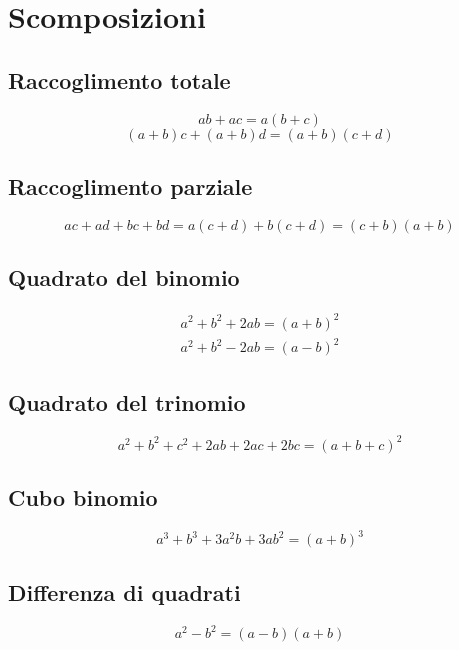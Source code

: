\chapter{Scomposizioni}
\section{Raccoglimento totale}
\begin{equation}
ab+ac=a(b+c)
\end{equation}
\begin{equation}
(a+b)c+(a+b)d=(a+b)(c+d)
\end{equation}
\section{Raccoglimento parziale}
\begin{equation}
ac+ad+bc+bd=a(c+d)+b(c+d)=(c+b)(a+b)
\end{equation}
\section{Quadrato del binomio}
\begin{align}
a^2+b^2+2ab=(a+b)^2\\
a^2+b^2-2ab=(a-b)^2
\end{align}
\section{Quadrato del trinomio}
\begin{equation}
a^2+b^2+c^2+2ab+2ac+2bc=(a+b+c)^2
\end{equation}
\section{Cubo binomio}
\begin{equation}
a^3+b^3+3a^2b+3ab^2=(a+b)^3
\end{equation}
\section{Differenza di quadrati}
\begin{equation}
a^2-b^2=(a-b)(a+b)
\end{equation}
